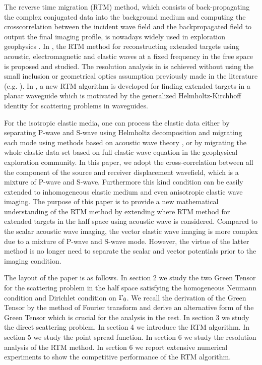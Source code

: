 \documentclass[12pt]{iopart}
\begin{document}
The reverse time migration (RTM) method, which consists of back-propagating
the complex conjugated data into the background medium and computing the crosscorrelation between the incident wave field and the backpropagated field to output the
final imaging profile, is nowadays widely used in exploration geophysics \cite{baysal1983reverse,berkhout2012seismic,bleistein2013mathematics,chang1987elastic,claerbout1985imaging}. In \cite{chen2013reverse_acou,chen2013reverse_elec,chen2015reverse_elas},
the RTM method for reconstructing extended targets using acoustic, electromagnetic and elastic
waves at a fixed frequency in the free space is proposed and studied. The resolution
analysis in \cite{chen2013reverse_acou,chen2013reverse_elec,chen2015reverse_elas} is achieved without using the small inclusion or geometrical optics
assumption previously made in the literature (e.g. \cite{ammari2013mathematical,bleistein2013mathematics}). In \cite{chen2015reverse_planar}, a new RTM algorithm
is developed for finding extended targets in a planar waveguide which is motivated by
the generalized Helmholtz-Kirchhoff identity for scattering problems in waveguides.

For the isotropic elastic media, one can process the elastic data either by separating P-wave and S-wave using Helmholtz decomposition and migrating each mode using methods based on acoustic
wave theory \cite{chung2012implementation,denli2008elastic}, or by migrating the whole elastic data set based on full elastic wave
equation in the geophysical exploration community. In this paper, we adopt the cross-correlation between all the component of the source
and receiver displacement wavefield, which is a mixture of P-wave and S-wave. Furthermore this kind condition can be easily extended to inhomogeneous elastic medium and even anisotropic elastic wave imaging. The purpose of this paper is to provide a new mathematical understanding of the RTM method by extending \cite{RTMhalf_aco} where RTM method for extended targets in the half space using acoustic wave is considered.  Compared to the scalar acoustic wave imaging, the vector elastic wave imaging is more complex due to a mixture of P-wave and S-wave mode. However, the virtue of the latter method is no longer need to separate the scalar and vector potentials  prior to the imaging condition.

The layout of the paper is as follows. In section 2 we study the two Green Tensor for
the scattering problem in the half space satisfying the homogeneous Neumann condition and Dirichlet condition on $\Gamma_0$. We recall the derivation of the Green
Tensor by the method of Fourier transform and derive an alternative form of the
Green Tensor which is crucial for the analysis in the rest. In section 3 we study the direct scattering problem. In section 4 we introduce the RTM
algorithm. In section 5 we study the point spread function. In section 6 we study
the resolution analysis of the RTM method. In section 6
we report extensive numerical experiments to show the competitive performance of the
RTM algorithm.
\end{document}
